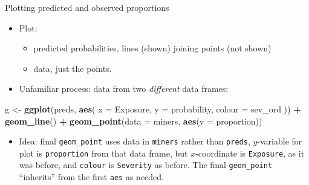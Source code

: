 \documentclass[ignorenonframetext,]{beamer}
\newenvironment{Shaded}{\begin{snugshade}}{\end{snugshade}}
\newcommand{\DataTypeTok}[1]{\textcolor[rgb]{0.13,0.29,0.53}{#1}}
\newcommand{\KeywordTok}[1]{\textcolor[rgb]{0.13,0.29,0.53}{\textbf{#1}}}
\newcommand{\NormalTok}[1]{#1}
\newcommand{\OperatorTok}[1]{\textcolor[rgb]{0.81,0.36,0.00}{\textbf{#1}}}
\newcommand{\StringTok}[1]{\textcolor[rgb]{0.31,0.60,0.02}{#1}}
\providecommand{\tightlist}{%
  \setlength{\itemsep}{0pt}\setlength{\parskip}{0pt}}
\begin{document}
\begin{frame}[fragile]{Plotting predicted and observed proportions}
\protect\hypertarget{plotting-predicted-and-observed-proportions}{}

\begin{itemize}
\tightlist
\item
  Plot:

  \begin{itemize}
  \item
    predicted probabilities, lines (shown) joining points (not shown)
  \item
    data, just the points.
  \end{itemize}
\item
  Unfamiliar process: data from two \emph{different} data frames:
\end{itemize}

\small

\begin{Shaded}
\begin{Highlighting}[]
\NormalTok{g <-}\StringTok{ }\KeywordTok{ggplot}\NormalTok{(preds, }\KeywordTok{aes}\NormalTok{(}
  \DataTypeTok{x =}\NormalTok{ Exposure, }\DataTypeTok{y =}\NormalTok{ probability,}
  \DataTypeTok{colour =}\NormalTok{ sev_ord}
\NormalTok{)) }\OperatorTok{+}\StringTok{ }\KeywordTok{geom_line}\NormalTok{() }\OperatorTok{+}
\StringTok{  }\KeywordTok{geom_point}\NormalTok{(}\DataTypeTok{data =}\NormalTok{ miners, }\KeywordTok{aes}\NormalTok{(}\DataTypeTok{y =}\NormalTok{ proportion))}
\end{Highlighting}
\end{Shaded}

\normalsize

\begin{itemize}
\tightlist
\item
  Idea: final \texttt{geom\_point} uses data in \texttt{miners} rather
  than \texttt{preds}, \(y\)-variable for plot is \texttt{proportion}
  from that data frame, but \(x\)-coordinate is \texttt{Exposure}, as it
  was before, and \texttt{colour} is \texttt{Severity} as before. The
  final \texttt{geom\_point} ``inherits'' from the first \texttt{aes} as
  needed.
\end{itemize}

\end{frame}
\end{document}
